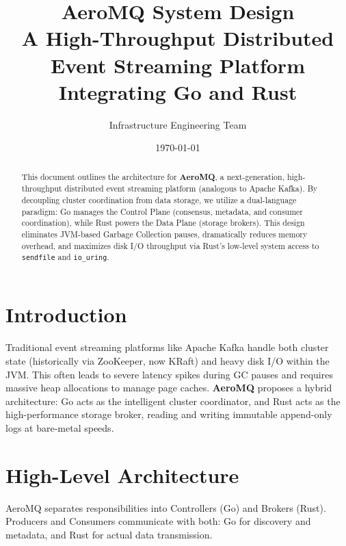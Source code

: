 \documentclass[11pt, a4paper]{article}
\title{\textbf{AeroMQ System Design} \\ \Large A High-Throughput Distributed Event Streaming Platform Integrating Go and Rust}
\author{Infrastructure Engineering Team}
\date{\today}
\begin{document}
\maketitle

\begin{abstract}
This document outlines the architecture for \textbf{AeroMQ}, a next-generation, high-throughput distributed event streaming platform (analogous to Apache Kafka). By decoupling cluster coordination from data storage, we utilize a dual-language paradigm: Go manages the Control Plane (consensus, metadata, and consumer coordination), while Rust powers the Data Plane (storage brokers). This design eliminates JVM-based Garbage Collection pauses, dramatically reduces memory overhead, and maximizes disk I/O throughput via Rust's low-level system access to \texttt{sendfile} and \texttt{io\_uring}.
\end{abstract}

\tableofcontents
\newpage

\section{Introduction}
Traditional event streaming platforms like Apache Kafka handle both cluster state (historically via ZooKeeper, now KRaft) and heavy disk I/O within the JVM. This often leads to severe latency spikes during GC pauses and requires massive heap allocations to manage page caches. \textbf{AeroMQ} proposes a hybrid architecture: Go acts as the intelligent cluster coordinator, and Rust acts as the high-performance storage broker, reading and writing immutable append-only logs at bare-metal speeds.

\section{High-Level Architecture}
AeroMQ separates responsibilities into Controllers (Go) and Brokers (Rust). Producers and Consumers communicate with both: Go for discovery and metadata, and Rust for actual data transmission.
\end{document}
